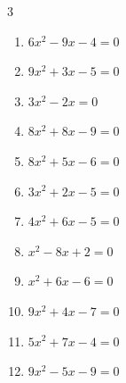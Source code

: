 \begin{multicols}{3}
\begin{enumerate}

  \item $6x^{2}-9x-4=0$


  \item $9x^{2}+3x-5=0$


  \item $3x^{2}-2x=0$


\columnbreak %

  \item $8x^{2}+8x-9=0$


  \item $8x^{2}+5x-6=0$


  \item $3x^{2}+2x-5=0$


  \item $4x^{2}+6x-5=0$


  \item $x^{2}-8x+2=0$


  \item $x^{2}+6x-6=0$


  \item $9x^{2}+4x-7=0$


\columnbreak %

\resetques

  \item $5x^{2}+7x-4=0$


  \item $9x^{2}-5x-9=0$


\end{enumerate}
\end{multicols}
